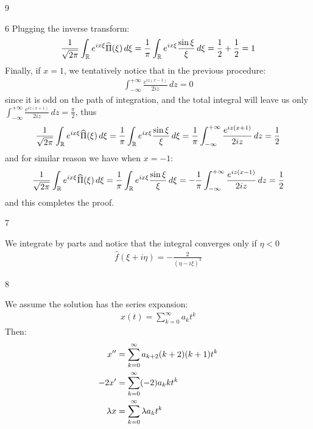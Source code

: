 \begin{vv286}{9}
\begin{vv286_mp}{6}
       Plugging the inverse transform: 
       \begin{align*}
	 \frac{1}{\sqrt{2\pi}}\int_{\mathbb{R}}e^{ix\xi}\widehat{\Pi}({\xi})\,
	 d\xi=\frac{1}{\pi}\int_{\mathbb{R}}e^{ix\xi}\frac{\sin \xi}{\xi}\, d\xi
	 =\frac{1}{2}+\frac{1}{2}=1
       \end{align*}
       Finally, if $x=1$, we tentatively notice that in the
       previous procedure:
       \begin{align*}
	 \int_{-\infty}^{+\infty}\frac{e^{iz(x-1)}}{2iz}\,dz=0
       \end{align*}
       since it is odd on the path of integration,
       and the total integral will leave us only $ \int_{-\infty}^{+\infty}\frac{e^{iz(x+1)}}{2iz}\,dz=\frac{\pi}{2}$, thus
 \begin{align*}
	 \frac{1}{\sqrt{2\pi}}\int_{\mathbb{R}}e^{ix\xi}\widehat{\Pi}({\xi})\,
	 d\xi=\frac{1}{\pi}\int_{\mathbb{R}}e^{ix\xi}\frac{\sin \xi}{\xi}\, d\xi
	 =\frac{1}{\pi}
	 \int_{-\infty}^{+\infty}\frac{e^{iz(x+1)}}{2iz}\,dz=\frac{1}{2}
       \end{align*}
and for similar reason we have when $x=-1$:
 \begin{align*}
	 \frac{1}{\sqrt{2\pi}}\int_{\mathbb{R}}e^{ix\xi}\widehat{\Pi}({\xi})\,
	 d\xi=\frac{1}{\pi}\int_{\mathbb{R}}e^{ix\xi}\frac{\sin \xi}{\xi}\, d\xi
	 =-\frac{1}{\pi}
	 \int_{-\infty}^{+\infty}\frac{e^{iz(x-1)}}{2iz}\,dz=\frac{1}{2}
       \end{align*}
       and this completes the proof.
  \end{vv286_mp}
   \begin{vv286_ms}{7}
       \item[]
	 We integrate by parts and notice that the integral
	 converges only if $\eta<0$
	 \begin{align*}
	   \widehat{f}(\xi+i\eta)=-\frac{2}{(\eta-i\xi)^3}
	 \end{align*}
       \end{vv286_ms}
       \begin{vv286_ms}{8}
    \item[(i)]
      We assume the solution has the series expansion:
      \begin{align*}
	x(t)=\sum_{k=0}^{\infty}a_kt^k
      \end{align*}
      Then:
      \begin{align*}
	x''&=\sum_{k=0}^{\infty}a_{k+2}(k+2)(k+1)t^k\\
	-2 x'&=\sum_{k=0}^{\infty}(-2)a_kkt^k\\
	\lambda x&=\sum_{k=0}^{\infty}\lambda a_k t^k
      \end{align*}

\end{vv286_ms}
\end{vv286}
